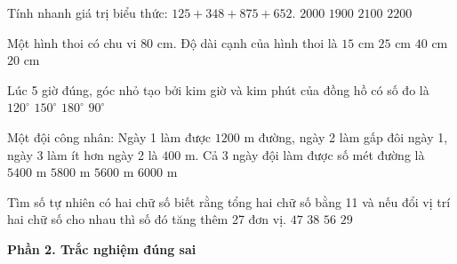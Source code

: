 \begin{ex} %
Tính nhanh giá trị biểu thức: $125 + 348 + 875 + 652$.
\choice
{\True $2000$}
{$1900$}
{$2100$}
{$2200$}
\end{ex}

\begin{ex} %
Một hình thoi có chu vi $80\text{ cm}$. Độ dài cạnh của hình thoi là
\choice
{$15\text{ cm}$}
{$25\text{ cm}$}
{$40\text{ cm}$}
{\True $20\text{ cm}$}
\end{ex}

\begin{ex} %
Lúc 5 giờ đúng, góc nhỏ tạo bởi kim giờ và kim phút của đồng hồ có số đo là
\choice
{$120^\circ$}
{\True $150^\circ$}
{$180^\circ$}
{$90^\circ$}
\end{ex}

\begin{ex} %
Một đội công nhân: Ngày 1 làm được $1200\text{ m}$ đường, ngày 2 làm gấp đôi ngày 1, ngày 3 làm ít hơn ngày 2 là $400\text{ m}$. Cả 3 ngày đội làm được số mét đường là
\choice
{$5400\text{ m}$}
{$5800\text{ m}$}
{\True $5600\text{ m}$}
{$6000\text{ m}$}
\end{ex}

\begin{ex} %
Tìm số tự nhiên có hai chữ số biết rằng tổng hai chữ số bằng 11 và nếu đổi vị trí hai chữ số cho nhau thì số đó tăng thêm 27 đơn vị.
\choice
{\True $47$}
{$38$}
{$56$}
{$29$}
\end{ex}

\textbf{Phần 2. Trắc nghiệm đúng sai}

